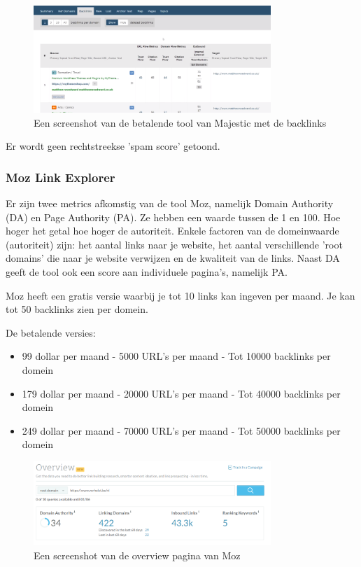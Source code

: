 \begin{figure}[h!]
\centering
\includegraphics[width=0.8\textwidth]{img/majesticbacklink.PNG}
\caption{Een screenshot van de betalende tool van Majestic met de backlinks
\autocite{majestic}}
\end{figure}

Er wordt geen rechtstreekse 'spam score' getoond. 

\subsubsection{Moz Link Explorer}
\label{ch: Moz Link Explorer}

Er zijn twee metrics afkomstig van de tool Moz, namelijk Domain Authority (DA) en Page Authority (PA). Ze hebben een waarde tussen de 1 en 100. Hoe hoger het getal hoe hoger de autoriteit. Enkele factoren van de domeinwaarde (autoriteit) zijn: het aantal links naar je website, het aantal verschillende 'root domains' die naar je website verwijzen en de kwaliteit van de links. Naast DA geeft de tool ook een score aan individuele pagina's, namelijk PA. 

Moz heeft een gratis versie waarbij je tot 10 links kan ingeven per maand. Je kan tot 50 backlinks zien per domein. 

De betalende versies: 
\begin{itemize}
\item 99 dollar per maand - 5000 URL's per maand - Tot 10000 backlinks per domein
\item 179 dollar per maand - 20000 URL's per maand - Tot 40000 backlinks per domein
\item 249 dollar per maand - 70000 URL's per maand - Tot 50000 backlinks per domein
\end{itemize}

\begin{figure}[h!]
\centering
\includegraphics[width=0.8\textwidth]{img/mozbacklink.PNG}
\caption{Een screenshot van de overview pagina van Moz
\autocite{moz}}
\end{figure}

